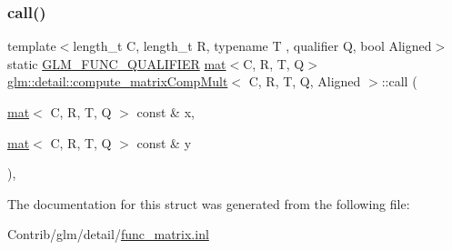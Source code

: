 \subsubsection{\texorpdfstring{call()}{call()}}
{\footnotesize\ttfamily template$<$length\+\_\+t C, length\+\_\+t R, typename T , qualifier Q, bool Aligned$>$ \\
static \mbox{\hyperlink{setup_8hpp_a33fdea6f91c5f834105f7415e2a64407}{G\+L\+M\+\_\+\+F\+U\+N\+C\+\_\+\+Q\+U\+A\+L\+I\+F\+I\+ER}} \mbox{\hyperlink{structglm_1_1mat}{mat}}$<$C, R, T, Q$>$ \mbox{\hyperlink{structglm_1_1detail_1_1compute__matrix_comp_mult}{glm\+::detail\+::compute\+\_\+matrix\+Comp\+Mult}}$<$ C, R, T, Q, Aligned $>$\+::call (\begin{DoxyParamCaption}\item[{\mbox{\hyperlink{structglm_1_1mat}{mat}}$<$ C, R, T, Q $>$ const \&}]{x,  }\item[{\mbox{\hyperlink{structglm_1_1mat}{mat}}$<$ C, R, T, Q $>$ const \&}]{y }\end{DoxyParamCaption})\hspace{0.3cm}{\ttfamily [inline]}, {\ttfamily [static]}}



The documentation for this struct was generated from the following file\+:\begin{DoxyCompactItemize}
\item 
Contrib/glm/detail/\mbox{\hyperlink{func__matrix_8inl}{func\+\_\+matrix.\+inl}}\end{DoxyCompactItemize}
